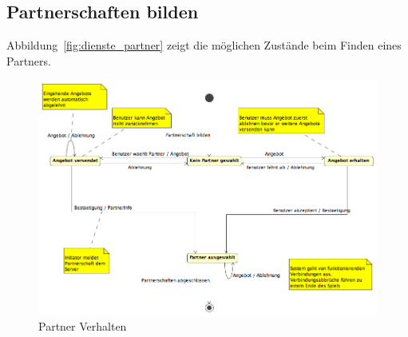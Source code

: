 \documentclass[12pt,halfparskip]{scrartcl}
\begin{document}
\subsection{Partnerschaften bilden} %
\label{sub:partnerschaften_bilden}
Abbildung~\vref{fig:dienste_partner} zeigt die möglichen Zustände beim Finden eines Partners.
\begin{figure}[h]
	\centering
	\includegraphics[width=\textwidth]{dienste_partner}
	\caption{Partner Verhalten}
	\label{fig:dienste_partner}
\end{figure}
\end{document}
